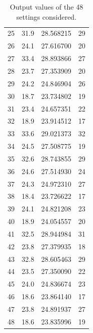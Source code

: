 \begin{table}[H]
{\begin{tabular}{lccc}
25 &                  31.9 &   28.568215 &          29 \\
26 &                  24.1 &   27.616700 &          20 \\
27 &                  33.4 &   28.893866 &          27 \\
28 &                  23.7 &   27.353909 &          20 \\
29 &                  24.2 &   24.846904 &          26 \\
30 &                  18.7 &   23.734802 &          19 \\
31 &                  23.4 &   24.657351 &          22 \\
32 &                  18.9 &   23.914512 &          17 \\
33 &                  33.6 &   29.021373 &          32 \\
34 &                  24.5 &   27.508775 &          19 \\
35 &                  32.6 &   28.743855 &          29 \\
36 &                  24.6 &   27.514930 &          24 \\
37 &                  24.3 &   24.972310 &          27 \\
38 &                  18.4 &   23.726622 &          17 \\
39 &                  24.1 &   24.821208 &          23 \\
40 &                  18.9 &   24.054557 &          20 \\
41 &                  32.5 &   28.944984 &          31 \\
42 &                  23.8 &   27.379935 &          18 \\
43 &                  32.8 &   28.605463 &          29 \\
44 &                  23.5 &   27.350090 &          22 \\
45 &                  24.0 &   24.836674 &          23 \\
46 &                  18.6 &   23.864140 &          17 \\
47 &                  23.8 &   24.891937 &          27 \\
48 &                  18.6 &   23.835996 &          19 \\
\bottomrule
\end{tabular}
}
    \caption{Output values of the 48 settings considered.}
    \label{tab:outputs48}
\end{table}

